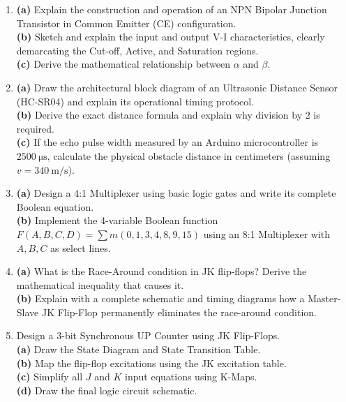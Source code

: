 \begin{enumerate}[label=\textbf{Q\arabic*.}, leftmargin=2em, start=18]
    \item \textbf{(a)} Explain the construction and operation of an NPN Bipolar Junction Transistor in Common Emitter (CE) configuration. \\
    \textbf{(b)} Sketch and explain the input and output V-I characteristics, clearly demarcating the Cut-off, Active, and Saturation regions. \\
    \textbf{(c)} Derive the mathematical relationship between $\alpha$ and $\beta$.
    
    \item \textbf{(a)} Draw the architectural block diagram of an Ultrasonic Distance Sensor (HC-SR04) and explain its operational timing protocol. \\
    \textbf{(b)} Derive the exact distance formula and explain why division by 2 is required. \\
    \textbf{(c)} If the echo pulse width measured by an Arduino microcontroller is $\SI{2500}{\micro\second}$, calculate the physical obstacle distance in centimeters (assuming $v = \SI{340}{\meter\per\second}$).
    
    \item \textbf{(a)} Design a 4:1 Multiplexer using basic logic gates and write its complete Boolean equation. \\
    \textbf{(b)} Implement the 4-variable Boolean function $F(A,B,C,D) = \sum m(0, 1, 3, 4, 8, 9, 15)$ using an 8:1 Multiplexer with $A, B, C$ as select lines.
    
    \item \textbf{(a)} What is the Race-Around condition in JK flip-flops? Derive the mathematical inequality that causes it. \\
    \textbf{(b)} Explain with a complete schematic and timing diagrams how a Master-Slave JK Flip-Flop permanently eliminates the race-around condition.
    
    \item Design a 3-bit Synchronous UP Counter using JK Flip-Flops. \\
    \textbf{(a)} Draw the State Diagram and State Transition Table. \\
    \textbf{(b)} Map the flip-flop excitations using the JK excitation table. \\
    \textbf{(c)} Simplify all $J$ and $K$ input equations using K-Maps. \\
    \textbf{(d)} Draw the final logic circuit schematic.
\end{enumerate}


